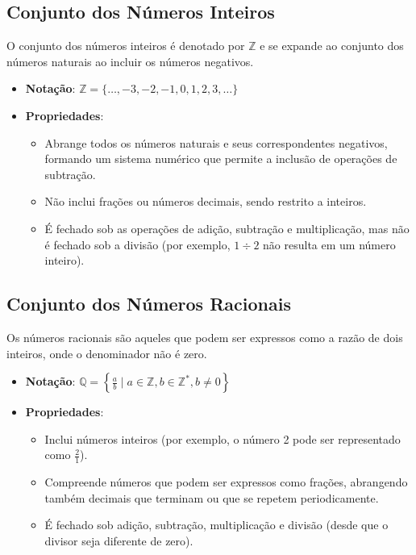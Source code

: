 \documentclass[a4paper,12pt]{article}  %
\begin{document}
\subsection{Conjunto dos Números Inteiros}
O conjunto dos números inteiros é denotado por \( \mathbb{Z} \) e se expande ao conjunto dos números naturais ao incluir os números negativos.

\begin{itemize}
    \item \textbf{Notação}: \( \mathbb{Z} = \{\ldots, -3, -2, -1, 0, 1, 2, 3, \ldots\} \)
    \item \textbf{Propriedades}:
          \begin{itemize}
              \item Abrange todos os números naturais e seus correspondentes negativos, formando um sistema numérico que permite a inclusão de operações de subtração.
              \item Não inclui frações ou números decimais, sendo restrito a inteiros.
              \item É fechado sob as operações de adição, subtração e multiplicação, mas não é fechado sob a divisão (por exemplo, \( 1 \div 2 \) não resulta em um número inteiro).
          \end{itemize}
\end{itemize}

\subsection{Conjunto dos Números Racionais}
Os números racionais são aqueles que podem ser expressos como a razão de dois inteiros, onde o denominador não é zero.

\begin{itemize}
    \item \textbf{Notação}: \( \mathbb{Q} = \left\{ \frac{a}{b} \mid a \in \mathbb{Z}, b \in \mathbb{Z}^*, b \neq 0 \right\} \)
    \item \textbf{Propriedades}:
          \begin{itemize}
              \item Inclui números inteiros (por exemplo, o número 2 pode ser representado como \( \frac{2}{1} \)).
              \item Compreende números que podem ser expressos como frações, abrangendo também decimais que terminam ou que se repetem periodicamente.
              \item É fechado sob adição, subtração, multiplicação e divisão (desde que o divisor seja diferente de zero).
          \end{itemize}
\end{itemize}
\end{document}
